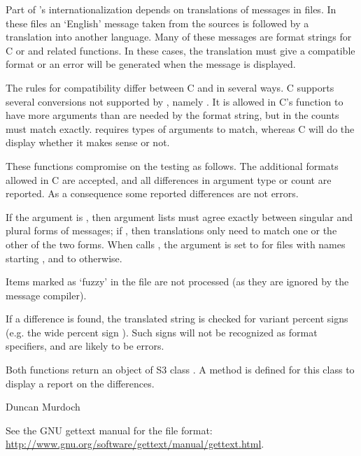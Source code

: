 \begin{Details}\relax

Part of \R{}'s internationalization depends on translations of messages
in  files.  In these files an `English' message taken
from the \R{} sources is followed by a translation into another
language.  Many of these messages are format strings for C or \R{}
 and related functions.  In these cases, the
translation must give a compatible format or an error will be
generated when the message is displayed.

The rules for compatibility differ between C and \R{} in several ways. C
supports several conversions not supported by \R{}, namely .  It is allowed in C's  function to have more
arguments than are needed by the format string, but in \R{} the counts
must match exactly.  \R{} requires types of arguments to match, whereas
C will do the display whether it makes sense or not.

These functions compromise on the testing as follows.  The additional
formats allowed in C are accepted, and all differences in argument
type or count are reported.  As a consequence some reported
differences are not errors.

If the  argument is , then argument
lists must agree exactly between singular and plural forms of messages; if
, then translations only need to match one or the other
of the two forms.  When  calls , 
the  argument is set to  for files with
names starting , and to  otherwise.

Items marked as `fuzzy' in the  file are not
processed (as they are ignored by the message compiler).

If a difference is found, the translated string is checked for variant
percent signs (e.g. the wide percent sign ).  Such signs
will not be recognized as format specifiers, and are likely to be 
errors.
\end{Details}
%
\begin{Value}
Both functions return an object of S3 class .  A
 method is defined for this class to display a report on
the differences.
\end{Value}
%
\begin{Author}\relax
Duncan Murdoch
\end{Author}
%
\begin{References}\relax
See the GNU gettext manual for the  file format:\\{}
\url{http://www.gnu.org/software/gettext/manual/gettext.html}.
\end{References}
